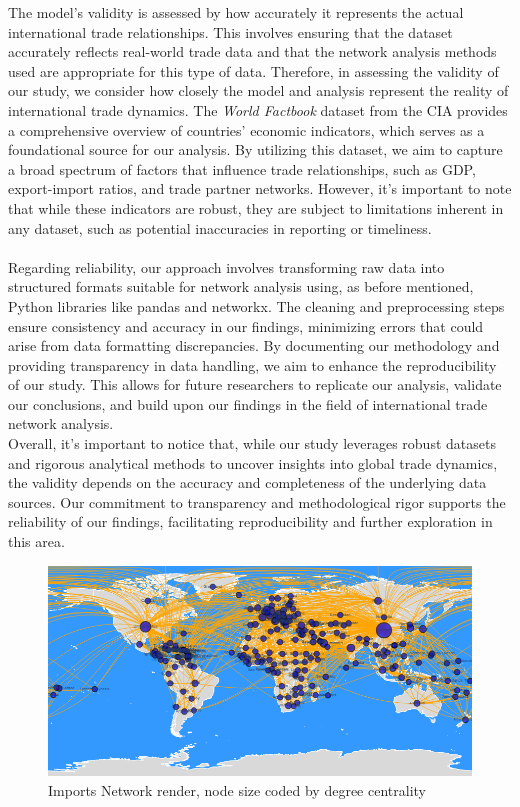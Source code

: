 \documentclass[12pt, a4paper]{article}
\begin{document}
The model's validity is assessed by how accurately it represents the actual international trade relationships. This involves ensuring that the dataset accurately reflects real-world trade data and that the network analysis methods used are appropriate for this type of data. Therefore, in assessing the validity of our study, we consider how closely the model and analysis represent the reality of international trade dynamics. The \textit{World Factbook} dataset from the CIA provides a comprehensive overview of countries' economic indicators, which serves as a foundational source for our analysis. By utilizing this dataset, we aim to capture a broad spectrum of factors that influence trade relationships, such as GDP, export-import ratios, and trade partner networks. However, it's important to note that while these indicators are robust, they are subject to limitations inherent in any dataset, such as potential inaccuracies in reporting or timeliness.
\\
\\Regarding reliability, our approach involves transforming raw data into structured formats suitable for network analysis using, as before mentioned, Python libraries like pandas and networkx. The cleaning and preprocessing steps ensure consistency and accuracy in our findings, minimizing errors that could arise from data formatting discrepancies. By documenting our methodology and providing transparency in data handling, we aim to enhance the reproducibility of our study. This allows for future researchers to replicate our analysis, validate our conclusions, and build upon our findings in the field of international trade network analysis.
\\Overall, it's important to notice that, while our study leverages robust datasets and rigorous analytical methods to uncover insights into global trade dynamics, the validity depends on the accuracy and completeness of the underlying data sources. Our commitment to transparency and methodological rigor supports the reliability of our findings, facilitating reproducibility and further exploration in this area.
\begin{figure}[ht]
\centering
\includegraphics[scale=0.6]{img/importsnet.png}
\captionsetup{font=scriptsize,labelfont=bf}
\caption{Imports Network render, node size coded by degree centrality}
\label{fig:importsnet}
\end{figure}
\end{document}
